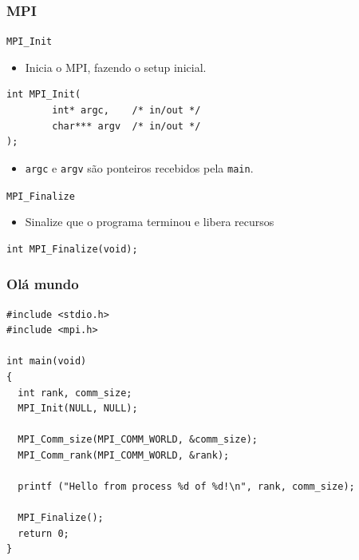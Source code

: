 \documentclass[xcolor={usenames,dvipsnames},12pt,presentation,aspectratio=169]{beamer}
\begin{document}
\begin{frame}[fragile]
  \frametitle{MPI}
\begin{block}{\texttt{MPI_Init}}
  \begin{itemize}
    \item Inicia o MPI, fazendo o setup inicial.
  \end{itemize}
  \begin{center}  
    \begin{minipage}{0.9\textwidth}
      \begin{verbatim}
int MPI_Init(
        int* argc,    /* in/out */
        char*** argv  /* in/out */
);
      \end{verbatim}
    \end{minipage}
    \end{center}
    \begin{itemize}
      \item \texttt{argc} e \texttt{argv} são ponteiros recebidos pela \texttt{main}.
    \end{itemize}  
  \end{block}
%
\begin{block}{\texttt{MPI_Finalize}}
  \begin{itemize}
    \item Sinalize que o programa terminou e libera recursos
  \end{itemize}
  \begin{center}  
    \begin{minipage}{0.9\textwidth}
      \begin{verbatim}
int MPI_Finalize(void);
      \end{verbatim}
    \end{minipage}
    \end{center}
  \end{block}
\end{frame}
\begin{frame}[fragile]
  \frametitle{Olá mundo}
\begin{center}
\begin{minipage}{0.95\textwidth}
  \begin{verbatim}
#include <stdio.h>
#include <mpi.h>

int main(void)
{
  int rank, comm_size;
  MPI_Init(NULL, NULL);

  MPI_Comm_size(MPI_COMM_WORLD, &comm_size);
  MPI_Comm_rank(MPI_COMM_WORLD, &rank);

  printf ("Hello from process %d of %d!\n", rank, comm_size);

  MPI_Finalize();
  return 0;
}
  \end{verbatim}
\end{minipage}
\end{center}
\end{frame}
\end{document}
